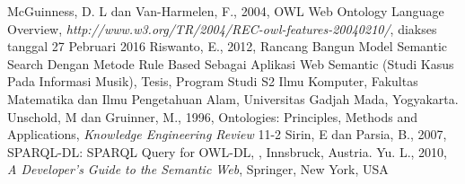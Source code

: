 \begin{thebibliography}{99}
		McGuinness, D. L dan Van-Harmelen, F., 2004, OWL Web Ontology Language Overview, \emph{http://www.w3.org/TR/2004/REC-owl-features-20040210/}, diakses tanggal 27 Pebruari 2016
		Riswanto, E., 2012, Rancang Bangun Model Semantic Search Dengan Metode Rule Based Sebagai Aplikasi Web Semantic (Studi Kasus Pada Informasi Musik), Tesis, Program Studi S2 Ilmu Komputer, Fakultas Matematika dan Ilmu Pengetahuan Alam, Universitas Gadjah Mada, Yogyakarta.
		Unschold, M dan Gruinner, M., 1996, Ontologies: Principles, Methods and Applications, \emph{Knowledge Engineering Review} 11-2
		Sirin, E dan Parsia, B., 2007, SPARQL-DL: SPARQL Query for OWL-DL, , Innsbruck, Austria.
		Yu. L., 2010, \emph{A Developer's Guide to the Semantic Web}, Springer, New York, USA
\end{thebibliography}
